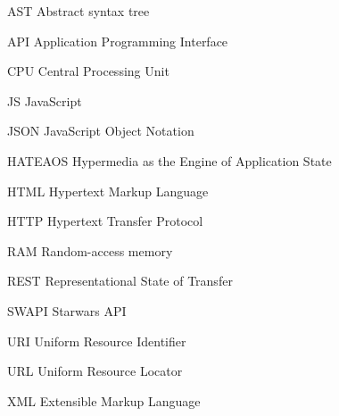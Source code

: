 \listoffigures
\cleardoublepage
\listoftables*
\cleardoublepage

\begin{siglas}
  \item[AST] Abstract syntax tree
  \item[API] Application Programming Interface
  \item[CPU] Central Processing Unit
  \item[JS] JavaScript
  \item[JSON] JavaScript Object Notation
  \item[HATEAOS] Hypermedia as the Engine of Application State
  \item[HTML] Hypertext Markup Language
  \item[HTTP] Hypertext Transfer Protocol
  \item[RAM] Random-access memory
  \item[REST] Representational State of Transfer
  \item[SWAPI] Starwars API
  \item[URI] Uniform Resource Identifier
  \item[URL] Uniform Resource Locator
  \item[XML] Extensible Markup Language
\end{siglas}
\cleardoublepage

\tableofcontents*
\cleardoublepage
